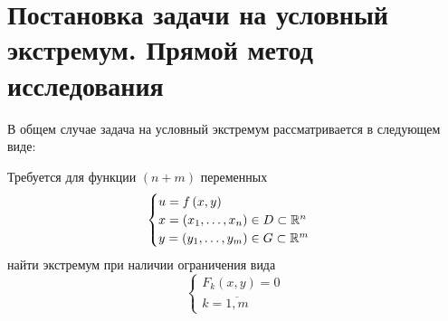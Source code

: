\documentclass[../../main.tex]{subfiles}
\begin{document}
\section{Постановка задачи на условный экстремум. Прямой метод исследования}

В общем случае задача на условный экстремум рассматривается в 
следующем виде:

Требуется для функции $(n+m)$ переменных
\begin{equation}
\label{lec_10.num_0}
\begin{cases}
	u = f\left( x, y \right) \\
	x = \left( x_1, \ldots, x_n \right) \in D \subset \mathbb{R}^n \\
	y = \left( y_1, \ldots, y_m \right) \in G \subset \mathbb{R}^m
\end{cases}
\end{equation}
найти экстремум при наличии ограничения вида
\begin{equation}
\begin{cases} \label{lec_10.num_1}
F_k(x, y) = 0 \\
k = \overline{1, m}
\end{cases} 
\end{equation}
\end{document}
